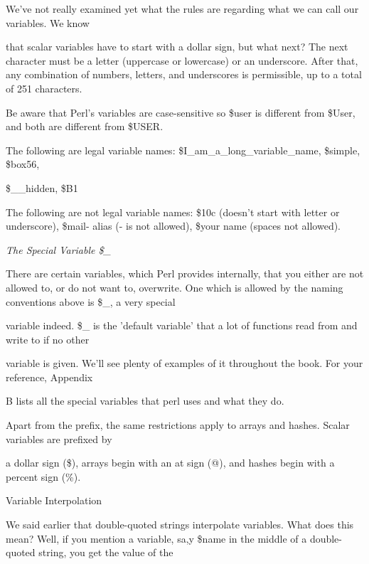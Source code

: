 \documentclass[a4paper,11pt]{book}
\begin{document}
\noindent We've not really examined yet what the rules are regarding what we can call our variables. We know

\noindent that scalar variables have to start with a dollar sign, but what next? The next character must be a letter (uppercase or lowercase) or an underscore. After that, any combination of numbers, letters, and underscores is permissible, up to a total of 251 characters.

\noindent 

\noindent Be aware that Perl's variables are case-sensitive so \$user is different from \$User, and both are different from \$USER.

\noindent 

\noindent The following are legal variable names: \$I\_am\_a\_long\_variable\_name, \$simple, \$box56,

\noindent \$\_\_hidden, \$B1

\noindent 

\noindent The following are not legal variable names: \$10c (doesn't start with letter or underscore), \$mail- alias (- is not allowed), \$your name (spaces not allowed).

\noindent 

\noindent \textit{The Special Variable \$\_}

\noindent There are certain variables, which Perl provides internally, that you either are not allowed to, or do not want to, overwrite. One which is allowed by the naming conventions above is \$\_, a very special

\noindent variable indeed. \$\_ is the 'default variable' that a lot of functions read from and write to if no other

\noindent variable is given. We'll see plenty of examples of it throughout the book. For your reference, Appendix

\noindent B lists all the special variables that perl uses and what they do.

\noindent 

\noindent Apart from the prefix, the same restrictions apply to arrays and hashes. Scalar variables are prefixed by

\noindent a dollar sign (\$), arrays begin with an at sign (@), and hashes begin with a percent sign (\%).

\noindent 

\noindent Variable Interpolation

\noindent 

\noindent We said earlier that double-quoted strings interpolate variables. What does this mean? Well, if you mention a variable, sa,y \$name in the middle of a double-quoted string, you get the value of the
\end{document}
